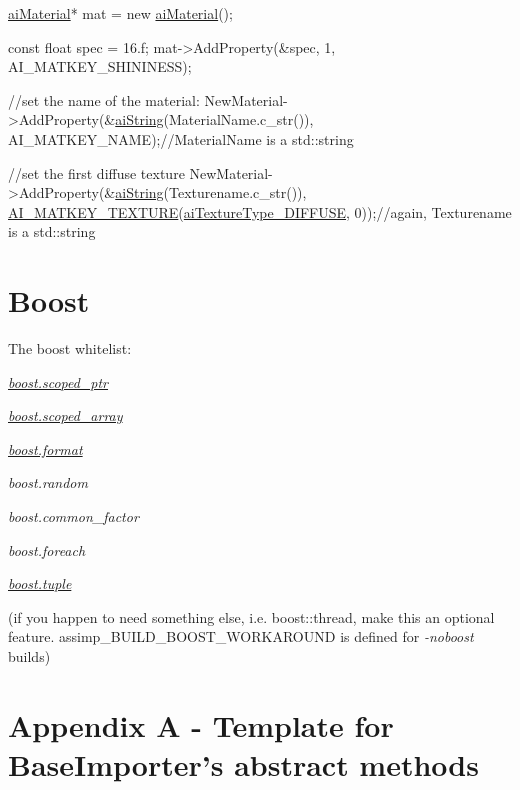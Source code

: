 \begin{DoxyCode}
\hyperlink{classai_material}{aiMaterial}* mat = \textcolor{keyword}{new} \hyperlink{classai_material}{aiMaterial}();

\textcolor{keyword}{const} \textcolor{keywordtype}{float} spec = 16.f;
mat->AddProperty(&spec, 1, AI\_MATKEY\_SHININESS);

\textcolor{comment}{//set the name of the material:}
NewMaterial->AddProperty(&\hyperlink{structai_string}{aiString}(MaterialName.c\_str()), AI\_MATKEY\_NAME);\textcolor{comment}{//MaterialName is a
       std::string}

\textcolor{comment}{//set the first diffuse texture}
NewMaterial->AddProperty(&\hyperlink{structai_string}{aiString}(Texturename.c\_str()), 
      \hyperlink{namespaceassimp_1_1material_a267de50d6dfe754f700df9e231ea6b60}{AI\_MATKEY\_TEXTURE}(\hyperlink{material_8h_a7dd415ff703a2cc53d1c22ddbbd7dde0a3027af56603d5babd7e2efcf5ed1debd}{aiTextureType\_DIFFUSE}, 0));\textcolor{comment}{//again, Texturename is
       a std::string}
\end{DoxyCode}
\hypertarget{extend_boost}{}\section{Boost}\label{extend_boost}
The boost whitelist\+: 
\begin{DoxyItemize}
\item {\itshape \hyperlink{classboost_1_1scoped__ptr}{boost.\+scoped\+\_\+ptr}} 
\item {\itshape \hyperlink{classboost_1_1scoped__array}{boost.\+scoped\+\_\+array}} 
\item {\itshape \hyperlink{classboost_1_1format}{boost.\+format}}  
\item {\itshape boost.\+random}  
\item {\itshape boost.\+common\+\_\+factor}  
\item {\itshape boost.\+foreach}  
\item {\itshape \hyperlink{classboost_1_1tuple}{boost.\+tuple}} 
\end{DoxyItemize}

(if you happen to need something else, i.\+e. boost\+::thread, make this an optional feature. {\ttfamily assimp\+\_\+\+B\+U\+I\+L\+D\+\_\+\+B\+O\+O\+S\+T\+\_\+\+W\+O\+R\+K\+A\+R\+O\+U\+N\+D} is defined for {\itshape -\/noboost} builds)\hypertarget{extend_appa}{}\section{Appendix A -\/ Template for Base\+Importer's abstract methods}\label{extend_appa}

